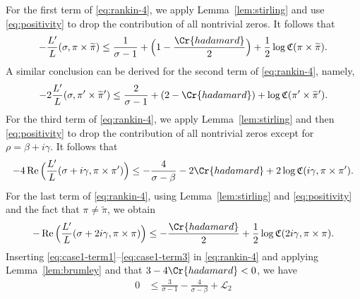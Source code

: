 \documentclass[12pt,reqno]{amsart}
\renewcommand{\tilde}{\widetilde}
\theoremstyle{remark}
\renewcommand{\tilde}{\widetilde}
\DeclareMathOperator{\Real}{Re}
\renewcommand{\tilde}{\widetilde}
\newcommand{\Q}{\mathbb{Q}}
\numberwithin{equation}{section}
\begin{document}
	
	For the first term of \eqref{eq:rankin-4}, we apply Lemma~\ref{lem:stirling} and use \eqref{eq:positivity} to drop the contribution of all nontrivial zeros. It follows that
	\begin{equation}\label{eq:case1-term1}
		\begin{aligned}
			-\frac{L'}{L}(\sigma, \pi \times \tilde{\pi}) %
            \le \frac{1}{\sigma-1}
			+\Big(1-\frac{\Cr{hadamard}}{2}\Big) + \frac{1}{2}\log \mathfrak{C}(\pi \times \tilde{\pi}).
		\end{aligned}
	\end{equation}
	A similar conclusion can be derived for the second term of \eqref{eq:rankin-4}, namely, 
	\begin{equation}\label{eq:case1-term2}
		\begin{aligned}
			-2\frac{L'}{L}(\sigma, \pi' \times \tilde{\pi}') \le \frac{2}{\sigma-1} + (2-\Cr{hadamard})+ \log \mathfrak{C}(\pi' \times \tilde{\pi}').
		\end{aligned}
	\end{equation}
	For the third term of \eqref{eq:rankin-4}, we apply Lemma~\ref{lem:stirling} and then \eqref{eq:positivity} to drop the contribution of all nontrivial zeros except for $\rho = \beta+i\gamma$. It follows that
	\begin{equation}\label{eq:case1-term4}
		\begin{aligned}
			- 4\Real\Big(\frac{L'}{L}(\sigma + i\gamma, \pi \times \pi') \Big) \le -\frac{4}{\sigma-\beta} -2\Cr{hadamard} +  2\log \mathfrak{C}(i\gamma, \pi \times \pi').
		\end{aligned}
	\end{equation}
	For the last term of \eqref{eq:rankin-4}, using Lemma~\ref{lem:stirling} and \eqref{eq:positivity} and the fact that $\pi \neq \tilde{\pi}$, we obtain
    \begin{equation}\label{eq:case1-term3}
		\begin{aligned}
			-\Real\Big(\frac{L'}{L}(\sigma + 2i\gamma, \pi \times \pi) \Big) \le  -\frac{\Cr{hadamard}}{2} + \frac{1}{2}\log \mathfrak{C}(2i\gamma, \pi \times \pi).
		\end{aligned}
	\end{equation} 
   Inserting \eqref{eq:case1-term1}--\eqref{eq:case1-term3} in \eqref{eq:rankin-4} and applying Lemma~\ref{lem:brumley} and that $3-4\Cr{hadamard} < 0$, we have
	\begin{equation}\label{eq:case1-combined}
		\begin{aligned}
			0 &\le \frac{3}{\sigma-1}-\frac{4}{\sigma-\beta} + \mathcal{L}_2
		\end{aligned}
	\end{equation}
\end{document}
